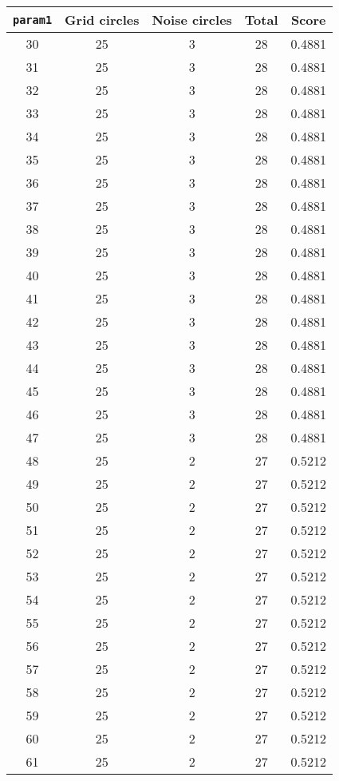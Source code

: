 \documentclass[letterpaper, 12pt]{article}
\begin{document}
\begin{longtable}{|c|c|c|c|c|}
\hline
\textbf{\texttt{param1}} & \textbf{Grid circles} & \textbf{Noise circles} & \textbf{Total} & \textbf{Score} \\
\hline
30 & 25 & 3 & 28 & 0.4881 \\
\hline
31 & 25 & 3 & 28 & 0.4881 \\
\hline
32 & 25 & 3 & 28 & 0.4881 \\
\hline
33 & 25 & 3 & 28 & 0.4881 \\
\hline
34 & 25 & 3 & 28 & 0.4881 \\
\hline
35 & 25 & 3 & 28 & 0.4881 \\
\hline
36 & 25 & 3 & 28 & 0.4881 \\
\hline
37 & 25 & 3 & 28 & 0.4881 \\
\hline
38 & 25 & 3 & 28 & 0.4881 \\
\hline
39 & 25 & 3 & 28 & 0.4881 \\
\hline
40 & 25 & 3 & 28 & 0.4881 \\
\hline
41 & 25 & 3 & 28 & 0.4881 \\
\hline
42 & 25 & 3 & 28 & 0.4881 \\
\hline
43 & 25 & 3 & 28 & 0.4881 \\
\hline
44 & 25 & 3 & 28 & 0.4881 \\
\hline
45 & 25 & 3 & 28 & 0.4881 \\
\hline
46 & 25 & 3 & 28 & 0.4881 \\
\hline
47 & 25 & 3 & 28 & 0.4881 \\
\hline
48 & 25 & 2 & 27 & 0.5212 \\
\hline
49 & 25 & 2 & 27 & 0.5212 \\
\hline
50 & 25 & 2 & 27 & 0.5212 \\
\hline
51 & 25 & 2 & 27 & 0.5212 \\
\hline
52 & 25 & 2 & 27 & 0.5212 \\
\hline
53 & 25 & 2 & 27 & 0.5212 \\
\hline
54 & 25 & 2 & 27 & 0.5212 \\
\hline
55 & 25 & 2 & 27 & 0.5212 \\
\hline
56 & 25 & 2 & 27 & 0.5212 \\
\hline
57 & 25 & 2 & 27 & 0.5212 \\
\hline
58 & 25 & 2 & 27 & 0.5212 \\
\hline
59 & 25 & 2 & 27 & 0.5212 \\
\hline
60 & 25 & 2 & 27 & 0.5212 \\
\hline
61 & 25 & 2 & 27 & 0.5212 \\

\end{longtable}
\end{document}
